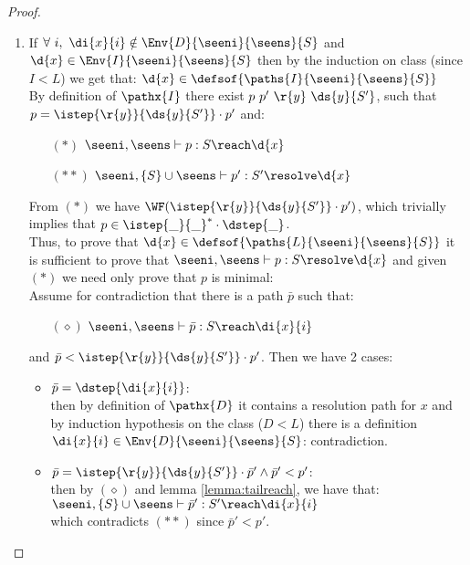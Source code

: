 \begin{proof}
\begin{enumerate}
\item If $\forall\ i,\ \di{x}{i} \notin \Env{D}{\seeni}{\seens}{S}$ and $\d{x} \in \Env{I}{\seeni}{\seens}{S}$
 then by the induction on class (since $I < L$) we get that:
 $\d{x} \in \defsof{\paths{I}{\seeni}{\seens}{S}}$\\
By definition of $\pathx{I}$ there exist $p\ p'\ \r{y}\ \ds{y}{S'}$, such that $p = \istep{\r{y}}{\ds{y}{S'}}  \cdot p'$ and:
\begin{itemize}[leftmargin=15mm]
 \item[$(*)$] $ \seeni,\seens \vdash p : S \reach \d{x}$
 \item[$(**)$] $ \seeni,\{S\} \cup \seens \vdash p' : S' \resolve \d{x}$
\end{itemize}
From $(*)$ we have $\WF(\istep{\r{y}}{\ds{y}{S'}}  \cdot p')$, which trivially implies that
 $p \in \istep{\_}{\_}^*\cdot \dstep{\_}$.\\
Thus, to prove that $\d{x} \in \defsof{\paths{L}{\seeni}{\seens}{S}}$ it is sufficient to prove that $ \seeni,\seens \vdash p : S \resolve \d{x}$ and given $(*)$ we need only 
prove that $p$ is minimal:\\
Assume for contradiction that there is a path $\bar{p}$ such that:
\begin{itemize}[leftmargin=15mm]
 \item[$ (\diamond)$] $ \seeni,\seens \vdash \bar{p} : S \reach \di{x}{i}$
\end{itemize}
and $\bar{p} < \istep{\r{y}}{\ds{y}{S'}}\cdot p'$. Then we have 2 cases:
\begin{itemize}[leftmargin=10mm]
 \item $\bar{p} = \dstep{\di{x}{i}}$:\\
  then by definition of $\pathx{D}$ it contains a resolution path for $x$ and by induction hypothesis on the class ($D < L$) there is a definition $\di{x}{i} \in \Env{D}{\seeni}{\seens}{S}$: contradiction.
 \item $\bar{p} = \istep{\r{y}}{\ds{y}{S'}}\cdot \bar{p}' \wedge \bar{p}' < p'$:\\
  then by $(\diamond)$ and lemma \ref{lemma:tailreach}, we have that:\\
  \tab $\seeni,\{S\} \cup \seens \vdash \bar{p}' : S' \reach \di{x}{i}$ \\
  which contradicts $(**)$ since $\bar{p}' < p'$.\medskip
\end{itemize}
\end{enumerate}


\end{proof}
